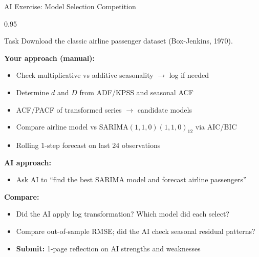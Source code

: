 \documentclass[9pt, aspectratio=169, t]{beamer}
\begin{document}
\begin{frame}{AI Exercise: Model Selection Competition}
    \begin{cminipage}{0.95\textwidth}
    {\small
    \begin{block}{Task}
        Download the classic airline passenger dataset (Box-Jenkins, 1970).
    \end{block}

    \vspace{0.05cm}

    \textbf{Your approach (manual):}
    \begin{itemize}\setlength{\itemsep}{0pt}
        \item Check multiplicative vs additive seasonality $\to$ log if needed
        \item Determine $d$ and $D$ from ADF/KPSS and seasonal ACF
        \item ACF/PACF of transformed series $\to$ candidate models
        \item Compare airline model vs SARIMA$(1,1,0)(1,1,0)_{12}$ via AIC/BIC
        \item Rolling 1-step forecast on last 24 observations
    \end{itemize}

    \vspace{0.05cm}

    \textbf{AI approach:}
    \begin{itemize}\setlength{\itemsep}{0pt}
        \item Ask AI to ``find the best SARIMA model and forecast airline passengers''
    \end{itemize}

    \vspace{0.05cm}

    \textbf{Compare:}
    \begin{itemize}\setlength{\itemsep}{0pt}
        \item Did the AI apply log transformation? Which model did each select?
        \item Compare out-of-sample RMSE; did the AI check seasonal residual patterns?
        \item \textbf{Submit:} 1-page reflection on AI strengths and weaknesses
    \end{itemize}
    }
    \end{cminipage}
\end{frame}

\end{document}
